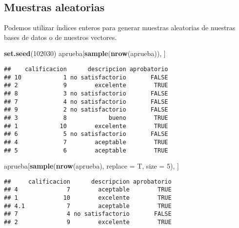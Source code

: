 \documentclass[]{article}
\newenvironment{Shaded}{\begin{snugshade}}{\end{snugshade}}
\newcommand{\KeywordTok}[1]{\textcolor[rgb]{0.13,0.29,0.53}{\textbf{{#1}}}}
\newcommand{\DataTypeTok}[1]{\textcolor[rgb]{0.13,0.29,0.53}{{#1}}}
\newcommand{\DecValTok}[1]{\textcolor[rgb]{0.00,0.00,0.81}{{#1}}}
\newcommand{\NormalTok}[1]{{#1}}
\begin{document}
\subsection{Muestras aleatorias}\label{muestras-aleatorias}

Podemos utilizar índices enteros para generar muestras aleatorias de
nuestras bases de datos o de nuestros vectores.

\begin{Shaded}
\begin{Highlighting}[]
\KeywordTok{set.seed}\NormalTok{(}\DecValTok{102030}\NormalTok{)}
\NormalTok{aprueba[}\KeywordTok{sample}\NormalTok{(}\KeywordTok{nrow}\NormalTok{(aprueba)), ]}
\end{Highlighting}
\end{Shaded}

\begin{verbatim}
##    calificacion      descripcion aprobatorio
## 10            1 no satisfactorio       FALSE
## 2             9        excelente        TRUE
## 8             3 no satisfactorio       FALSE
## 7             4 no satisfactorio       FALSE
## 9             2 no satisfactorio       FALSE
## 3             8            bueno        TRUE
## 1            10        excelente        TRUE
## 6             5 no satisfactorio       FALSE
## 4             7        aceptable        TRUE
## 5             6        aceptable        TRUE
\end{verbatim}

\begin{Shaded}
\begin{Highlighting}[]
\NormalTok{aprueba[}\KeywordTok{sample}\NormalTok{(}\KeywordTok{nrow}\NormalTok{(aprueba), }\DataTypeTok{replace =} \NormalTok{T, }\DataTypeTok{size =} \DecValTok{5}\NormalTok{), ]}
\end{Highlighting}
\end{Shaded}

\begin{verbatim}
##     calificacion      descripcion aprobatorio
## 4              7        aceptable        TRUE
## 1             10        excelente        TRUE
## 4.1            7        aceptable        TRUE
## 7              4 no satisfactorio       FALSE
## 2              9        excelente        TRUE
\end{verbatim}

\renewcommand\bcStyleTitre[1]{\large\textcolor{bbblack}{#1}}
\end{document}
